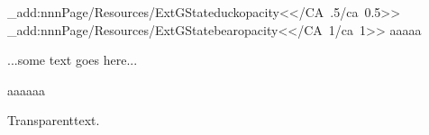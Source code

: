 \documentclass{article}
\begin{document}
\ExplSyntaxOn
\pdfmanagement_add:nnn{Page/Resources/ExtGState}{duckopacity}{<</CA~.5/ca~0.5>>}
\pdfmanagement_add:nnn{Page/Resources/ExtGState}{bearopacity}{<</CA~1/ca~1>>}
\ExplSyntaxOff
aaaaa
...some text goes here...
aaaaaa
   Transparent\newpage text.
%
\end{document}
